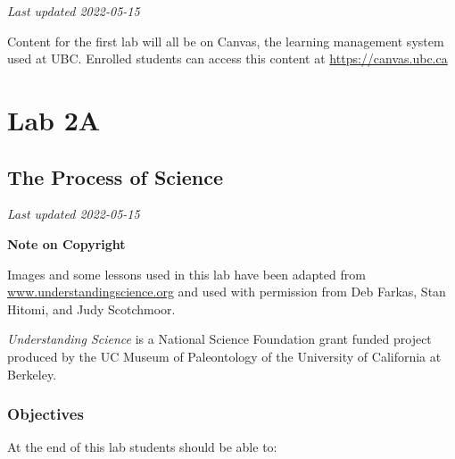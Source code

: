\documentclass[
]{book}
\begin{document}
\emph{Last updated 2022-05-15}

Content for the first lab will all be on Canvas, the learning management system used at UBC. Enrolled students can access this content at \url{https://canvas.ubc.ca}

\hypertarget{part-lab-2a}{%
\part*{Lab 2A}\label{part-lab-2a}}

\hypertarget{the-process-of-science}{%
\chapter*{The Process of Science}\label{the-process-of-science}}

\emph{Last updated 2022-05-15}

\textbf{Note on Copyright}

Images and some lessons used in this lab have been adapted from \href{http://www.understandingscience.org/}{www.understandingscience.org} and used with permission from Deb Farkas, Stan Hitomi, and Judy Scotchmoor.

\emph{Understanding Science} is a National Science Foundation grant funded project produced by the UC Museum of Paleontology of the University of California at Berkeley.

\hypertarget{objectives}{%
\section*{Objectives}\label{objectives}}

At the end of this lab students should be able to:
\end{document}
